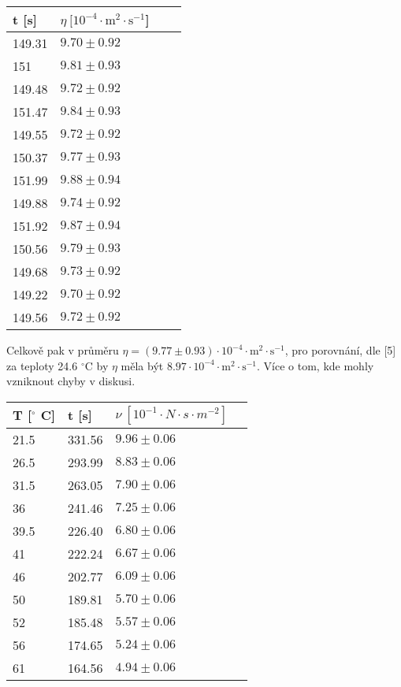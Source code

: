 \documentclass{article}
\begin{document}
\begin{center}
     \label{tab:title}
    \begin{tabular}{ | l | l | l | p{5cm} |} \hline
    t [s]  & $\eta \: \mathrm{[10^{-4} \cdot m^{2} \cdot s^{-1}}$]    \\ \hline
    149.31 & $9.70\pm0.92$ \\ \hline
    151    & $9.81\pm0.93$ \\ \hline
    149.48 & $9.72\pm0.92$ \\ \hline
    151.47 & $9.84\pm0.93$ \\ \hline
    149.55 & $9.72\pm0.92$ \\ \hline
    150.37 & $9.77\pm0.93$ \\ \hline
    151.99 & $9.88\pm0.94$ \\ \hline
    149.88 & $9.74\pm0.92$ \\ \hline
    151.92 & $9.87\pm0.94$ \\ \hline
    150.56 & $9.79\pm0.93$ \\ \hline
    149.68 & $9.73\pm0.92$ \\ \hline
    149.22 & $9.70\pm0.92$ \\ \hline
    149.56 & $9.72\pm0.92$ \\ \hline
    \end{tabular}
\end{center}
\par Celkově pak v průměru $\eta = (9.77\pm0.93)\cdot \mathrm{10^{-4} \cdot m^{2} \cdot s^{-1}}$, pro porovnání, dle [5] za teploty 24.6 $^{\circ}$C by $\eta$ měla být $8.97\cdot \mathrm{10^{-4} \cdot m^{2} \cdot s^{-1}}$. Více o tom, kde mohly vzniknout chyby v diskusi.
\bigbreak
\bigbreak
\begin{center}
     \label{tab:title}
    \begin{tabular}{ | l | l | l | p{5cm} |} \hline
    T [$^{\circ}$ C]  & t [s]    & $\nu \: [10^{-1} \cdot N \cdot s \cdot m^{-2}]$    \\ \hline
    21.5 & 331.56 & $9.96\pm0.06$ \\ \hline
    26.5 & 293.99 & $8.83\pm0.06$ \\ \hline
    31.5 & 263.05 & $7.90\pm0.06$ \\ \hline
    36   & 241.46 & $7.25\pm0.06$ \\ \hline
    39.5 & 226.40  & $6.80\pm0.06$ \\ \hline
    41   & 222.24 & $6.67\pm0.06$ \\ \hline
    46   & 202.77 & $6.09\pm0.06$ \\ \hline
    50   & 189.81 & $5.70\pm0.06$ \\ \hline
    52   & 185.48 & $5.57\pm0.06$ \\ \hline
    56   & 174.65 & $5.24\pm0.06$ \\ \hline
    61   & 164.56 & $4.94\pm0.06$ \\ \hline
    \end{tabular}
\end{center}
\end{document}
